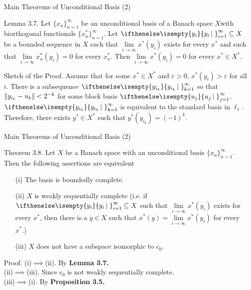 \documentclass{beamer}
\newcommand{\xn}{\{x_n\}_{n=1}^\infty}
\newcommand{\xns}{\{x_n^*\}_{n=1}^\infty}
\begin{document}
\begin{frame}{Main Theorems of Unconditional Basis (2)}
    \begin{block}{Lemma 3.7.}
        Let $\xn$ be an unconditional basis of a Banach space $X$with biorthogonal functionals $\xns$. Let $\set{y_i}_{i=1}^\infty\subseteq X$ be a bounded sequence in $X$ such that $\lim\limits_{i\to\infty} x^*(y_i)$ exists for every $x^*$ and such that $\lim\limits_{i\to\infty} x_n^*(y_i)=0$ for every $x_n^*$. Then $\lim\limits_{i\to\infty} x^*(y_i)=0$ for every $x^*\in X^*$.
    \end{block}
Sketch of the Proof. Assume that for some $x^*\in X^*$ and $\varepsilon>0$, $x^*(y_i)>\varepsilon$ for all $i$. There is a subsequence $\set{y_{i_k}}_{k=1}^\infty$ so that $\left\lVert y_{i_k}-u_k \right\rVert<2^{-k}$ for some block basis $\set{u_j}_{j=1}^\infty$. $\set{y_{i_k}}_{k=1}^\infty$ is equivalent to the standard basis in $\ell_1$. Therefore, there exists $y^*\in X^*$ such that $y^*(y_{i_k})=(-1)^k$.
\end{frame}
\begin{frame}{Main Theorems of Unconditional Basis (2)}
        \begin{block}{Theorem 3.8.}
        Let $X$ be a Banach space with an unconditional basis $\xn$. Then the following assertions are equivalent \begin{itemize}
         \item[(i)] The basis is boundedly complete.
         \item[(ii)] $X$ is weakly sequentially complete (i.e. if $\set{y_i}_{i=1}^\infty\subseteq X$ such that $\lim\limits_{i\to\infty} x^*(y_i)$ exists for every $x^*$, then there is a $y\in X$ such that $x^*(y)=\lim\limits_{i\to\infty} x^*(y_i)$ for every $x^*$.)
         \item[(iii)] $X$ does not have a subspace isomorphic to $c_0$.
     \end{itemize}
    
        \end{block}
          Proof. (i)$\implies$(ii). By \textbf{Lemma 3.7.}\\
    (ii)$\implies$(iii). Since $c_0$ is not weakly sequentially complete.\\
    (iii)$\implies$(i). By \textbf{Proposition 3.5.}
\end{frame}
\end{document}

